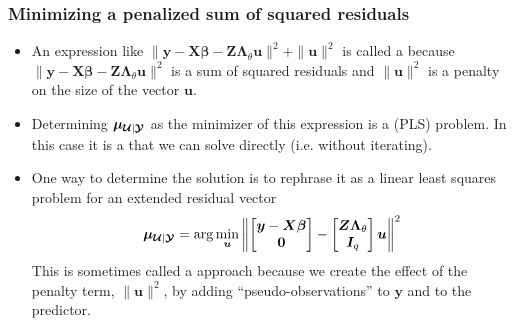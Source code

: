 \documentclass[dvipsnames,pdflatex,beamer]{beamer}
\newcommand{\bLt}{\ensuremath{\bm\Lambda_\theta}}
\begin{document}
\begin{frame}
  \frametitle{Minimizing a penalized sum of squared residuals}  
  \begin{itemize}
  \item An expression like $\|\bm y-\bm X\bm\beta-\bm Z\bLt\bm
    u\|^2 + \|\bm u\|^2$ is called a  because $\|\bm y-\bm X\bm\beta-\bm Z\bLt\bm
    u\|^2$ is a sum of squared residuals and $\|\bm u\|^2$ is a
    penalty on the size of the vector $\bm u$.
  \item Determining $\bm\mu_{\bm{\mathcal{U}}|\bm{\mathcal{Y}}}$ as the minimizer of
    this expression is a  (PLS) problem.  In
    this case it is a 
    that we can solve directly (i.e. without iterating).
  \item One way to determine the solution is to rephrase it as a
    linear least squares problem for an extended residual vector
    \begin{displaymath}
      \bm\mu_{\bc U|\bc Y}=\arg\min_{\bm u}\left\|
        \begin{bmatrix}\bm y-\bm X\bm\beta\\\bm 0\end{bmatrix}-
        \begin{bmatrix}\bm Z\bLt\\\bm I_q\end{bmatrix}
        \bm u\right\|^2
    \end{displaymath}
    This is sometimes called a  approach because we
    create the effect of the penalty term, $\|\bm u\|^2$, by adding
    ``pseudo-observations'' to $\bm y$ and to the predictor.
  \end{itemize}
\end{frame}
\end{document}

